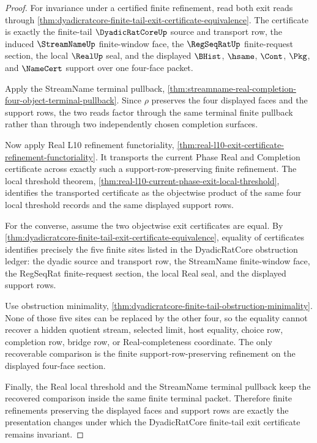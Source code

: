 \begin{proof}
For invariance under a certified finite refinement, read both exit reads through \autoref{thm:dyadicratcore-finite-tail-exit-certificate-equivalence}. The certificate is exactly the finite-tail $\DyadicRatCoreUp$ source and transport row, the induced $\StreamNameUp$ finite-window face, the $\RegSeqRatUp$ finite-request section, the local $\RealUp$ seal, and the displayed $\BHist$, $\hsame$, $\Cont$, $\Pkg$, and $\NameCert$ support over one four-face packet.

Apply the StreamName terminal pullback, \autoref{thm:streamname-real-completion-four-object-terminal-pullback}. Since $\rho$ preserves the four displayed faces and the support rows, the two reads factor through the same terminal finite pullback rather than through two independently chosen completion surfaces.

Now apply Real L10 refinement functoriality, \autoref{thm:real-l10-exit-certificate-refinement-functoriality}. It transports the current Phase Real and Completion certificate across exactly such a support-row-preserving finite refinement. The local threshold theorem, \autoref{thm:real-l10-current-phase-exit-local-threshold}, identifies the transported certificate as the objectwise product of the same four local threshold records and the same displayed support rows.

For the converse, assume the two objectwise exit certificates are equal. By \autoref{thm:dyadicratcore-finite-tail-exit-certificate-equivalence}, equality of certificates identifies precisely the five finite sites listed in the DyadicRatCore obstruction ledger: the dyadic source and transport row, the StreamName finite-window face, the RegSeqRat finite-request section, the local Real seal, and the displayed support rows.

Use obstruction minimality, \autoref{thm:dyadicratcore-finite-tail-obstruction-minimality}. None of those five sites can be replaced by the other four, so the equality cannot recover a hidden quotient stream, selected limit, host equality, choice row, completion row, bridge row, or Real-completeness coordinate. The only recoverable comparison is the finite support-row-preserving refinement on the displayed four-face section.

Finally, the Real local threshold and the StreamName terminal pullback keep the recovered comparison inside the same finite terminal packet. Therefore finite refinements preserving the displayed faces and support rows are exactly the presentation changes under which the DyadicRatCore finite-tail exit certificate remains invariant.
\end{proof}

